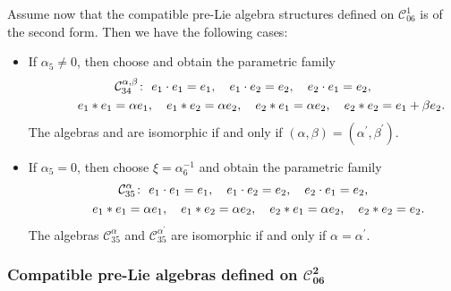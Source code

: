 \documentclass[pdftex]{sigma}
\numberwithin{equation}{section}
\begin{document}
Assume now that the compatible pre-Lie algebra structures
defined on $\mathcal{C}_{06}^{1}$ is of the second form. Then we have the
following cases:
\begin{itemize}\itemsep=0pt
\item If $\alpha _{5}\neq 0$, then choose 
and obtain the parametric family
\begin{gather*}
\mathcal{C}_{34}^{\alpha ,\beta } \colon \
e_{1}\cdot e_{1}=e_{1},\quad e_{1}\cdot e_{2}=e_{2},\quad e_{2}\cdot
e_{1}=e_{2}, \\
\hphantom{\mathcal{C}_{34}^{\alpha ,\beta } \colon} \
e_{1}\ast e_{1}=\alpha e_{1},\quad e_{1}\ast e_{2}=\alpha e_{2},\quad
e_{2}\ast e_{1}=\alpha e_{2},\quad e_{2}\ast e_{2}=e_{1}+\beta e_{2}.
\end{gather*}
The algebras \smash{$\mathcal{C}_{34}^{\alpha ,\beta }$} and  are isomorphic if and only if $(\alpha,\beta)= (\alpha^{\prime },\beta ^{\prime })$.

\item If $\alpha _{5}=0$, then choose $\xi = {\alpha^{-1} _{6}}$ and
obtain the parametric family
\begin{gather*}
\mathcal{C}_{35}^{\alpha } \colon \
e_{1}\cdot e_{1}=e_{1},\quad e_{1}\cdot e_{2}=e_{2},\quad e_{2}\cdot
e_{1}=e_{2}, \\
\hphantom{\mathcal{C}_{35}^{\alpha } \colon} \
e_{1}\ast e_{1}=\alpha e_{1},\quad e_{1}\ast e_{2}=\alpha e_{2},\quad
e_{2}\ast e_{1}=\alpha e_{2},\quad e_{2}\ast e_{2}=e_{2}.
\end{gather*}
The algebras $\mathcal{C}_{35}^{\alpha }$ and $\mathcal{C}_{35}^{\alpha ^{\prime }}
$ are isomorphic if and only if $\alpha =\alpha ^{\prime }$.
\end{itemize}

\subsubsection[Compatible pre-Lie algebras defined on C\_\{06\}\^{}2]{Compatible pre-Lie algebras defined on $\boldsymbol{\mathcal{C}_{06}^{2}}$}
\end{document}
